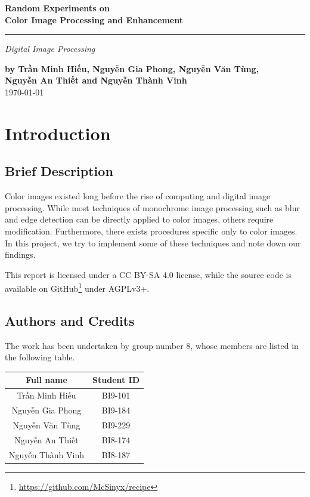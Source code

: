 \documentclass[a4paper,12pt]{article}
\begin{document}
\setcounter{page}{0}
\thispagestyle{empty}
\begin{flushright}
  \setlength{\baselineskip}{1.4\baselineskip}
\textbf{\Large Random Experiments on\\
        Color Image Processing and Enhancement}
  \noindent\rule{\textwidth}{5pt}
  \emph{\Large Digital Image Processing}

  \textbf{by Trần Minh Hiếu, Nguyễn Gia Phong, Nguyễn Văn Tùng,\\
          Nguyễn An Thiết and Nguyễn Thành Vinh\\}
  \today
\end{flushright}
\pagebreak

\tableofcontents
\pagebreak

\section{Introduction}
\subsection{Brief Description}
Color images existed long before the rise of computing and digital image
processing.  While most techniques of monochrome image processing such as
blur and edge detection can be directly applied to color images, others
require modification.  Furthermore, there exists procedures specific only
to color images.  In this project, we try to implement some of these
techniques and note down our findings.

This report is licensed under a CC BY-SA 4.0 license, while the source code
is available on GitHub\footnote{\url{https://github.com/McSinyx/recipe}}
under AGPLv3+.

\subsection{Authors and Credits}
The work has been undertaken by group number 8, whose members are listed
in the following table.
\begin{center}
  \begin{tabular}{c c}
    \toprule
    Full name & Student ID\\
    \midrule
    Trần Minh Hiếu & BI9-101\\
    Nguyễn Gia Phong & BI9-184\\
    Nguyễn Văn Tùng & BI9-229\\
    Nguyễn An Thiết & BI8-174\\
    Nguyễn Thành Vinh & BI8-187\\
    \bottomrule
  \end{tabular}
\end{center}
\end{document}
